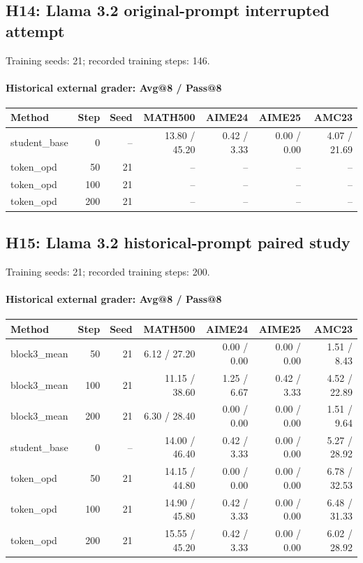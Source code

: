\subsection{H14: Llama 3.2 original-prompt interrupted attempt}
\label{history:llama_native_stopped}
Training seeds: 21; recorded training steps: 146.
\paragraph{Historical external grader: Avg@8 / Pass@8}
{\footnotesize\setlength{\tabcolsep}{3.5pt}
\begin{longtable}{@{}p{1.4in}rrrrrr@{}}
\toprule
Method & Step & Seed & MATH500 & AIME24 & AIME25 & AMC23 \\
\midrule\endhead
student\_\allowbreak{}base & 0 & -- & 13.80 / 45.20 & 0.42 / 3.33 & 0.00 / 0.00 & 4.07 / 21.69 \\
token\_\allowbreak{}opd & 50 & 21 & -- & -- & -- & -- \\
token\_\allowbreak{}opd & 100 & 21 & -- & -- & -- & -- \\
token\_\allowbreak{}opd & 200 & 21 & -- & -- & -- & -- \\
\bottomrule\end{longtable}
}
\subsection{H15: Llama 3.2 historical-prompt paired study}
\label{history:llama_historical}
Training seeds: 21; recorded training steps: 200.
\paragraph{Historical external grader: Avg@8 / Pass@8}
{\footnotesize\setlength{\tabcolsep}{3.5pt}
\begin{longtable}{@{}p{1.4in}rrrrrr@{}}
\toprule
Method & Step & Seed & MATH500 & AIME24 & AIME25 & AMC23 \\
\midrule\endhead
block3\_\allowbreak{}mean & 50 & 21 & 6.12 / 27.20 & 0.00 / 0.00 & 0.00 / 0.00 & 1.51 / 8.43 \\
block3\_\allowbreak{}mean & 100 & 21 & 11.15 / 38.60 & 1.25 / 6.67 & 0.42 / 3.33 & 4.52 / 22.89 \\
block3\_\allowbreak{}mean & 200 & 21 & 6.30 / 28.40 & 0.00 / 0.00 & 0.00 / 0.00 & 1.51 / 9.64 \\
student\_\allowbreak{}base & 0 & -- & 14.00 / 46.40 & 0.42 / 3.33 & 0.00 / 0.00 & 5.27 / 28.92 \\
token\_\allowbreak{}opd & 50 & 21 & 14.15 / 44.80 & 0.00 / 0.00 & 0.00 / 0.00 & 6.78 / 32.53 \\
token\_\allowbreak{}opd & 100 & 21 & 14.90 / 45.80 & 0.42 / 3.33 & 0.00 / 0.00 & 6.48 / 31.33 \\
token\_\allowbreak{}opd & 200 & 21 & 15.55 / 45.20 & 0.42 / 3.33 & 0.00 / 0.00 & 6.02 / 28.92 \\
\bottomrule\end{longtable}
}
